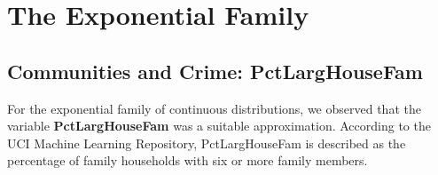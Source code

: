 \documentclass[12pt, letterpaper]{report}
\begin{document}
\maketitle
\chapter{The Exponential Family}
\section{Communities and Crime: PctLargHouseFam}

For the exponential family of continuous distributions, we observed that the variable \textbf{PctLargHouseFam} was a suitable approximation. 
According to the UCI Machine Learning Repository, PctLargHouseFam is described as the percentage of family households with six or more family members. 
\end{document}
